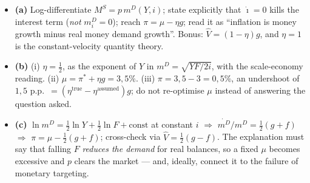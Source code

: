 \documentclass[11pt, a4paper]{article}
\newcommand{\Ms}{M^{S}}
\newcommand{\md}{m^{D}}
\begin{document}
\begin{tcolorbox}[rubricbox]
\small
\begin{itemize}
\item \textbf{(a)} Log-differentiate $\Ms=p\,\md(Y,i)$; state explicitly that $\dot\imath=0$
      kills the interest term (\emph{not} $\md_i=0$); reach $\pi=\mu-\eta g$; read it as
      ``inflation is money growth minus real money demand growth''. Bonus: $\hat V=(1-\eta)g$,
      and $\eta=1$ is the constant-velocity quantity theory.
\item \textbf{(b)} (i) $\eta=\tfrac12$, as the exponent of $Y$ in $\md=\sqrt{YF/2i}$, with the
      scale-economy reading. (ii) $\mu=\pi^{\ast}+\eta g=3{,}5\%$. (iii) $\pi=3{,}5-3=0{,}5\%$,
      an undershoot of $1{,}5$ p.p.\ $=(\eta^{\text{true}}-\eta^{\text{assumed}})g$; do not
      re-optimise $\mu$ instead of answering the question asked.
\item \textbf{(c)} $\ln\md=\tfrac12\ln Y+\tfrac12\ln F+\text{const}$ at constant $i$
      $\Rightarrow$ $\dot{\md}/\md=\tfrac12(g+f)$ $\Rightarrow$ $\pi=\mu-\tfrac12(g+f)$;
      cross-check via $\hat V=\tfrac12(g-f)$. The explanation must say that falling $F$
      \emph{reduces the demand} for real balances, so a fixed $\mu$ becomes excessive and $p$
      clears the market --- and, ideally, connect it to the failure of monetary targeting.
\end{itemize}
\end{tcolorbox}
\end{document}
